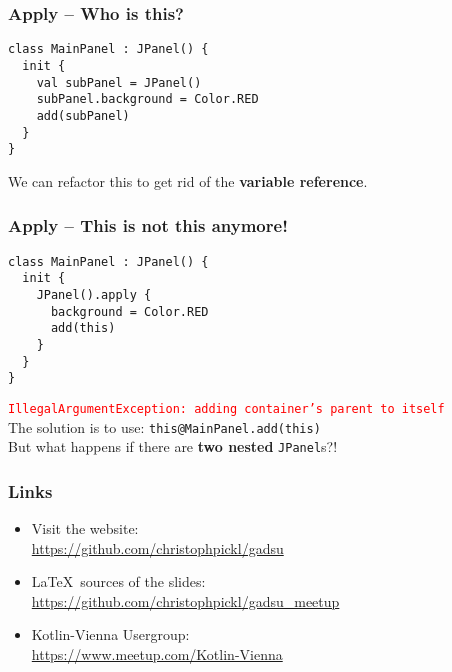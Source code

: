 \begin{frame}[fragile] \frametitle{Apply -- Who is this?}
\begin{lstlisting}
class MainPanel : JPanel() {
  init {
    val subPanel = JPanel()
    subPanel.background = Color.RED
    add(subPanel)
  }
}
\end{lstlisting}
\pause
We can refactor this to get rid of the \textbf{variable reference}.
\end{frame}


\begin{frame}[fragile] \frametitle{Apply -- This is not this anymore!}
\begin{lstlisting}
class MainPanel : JPanel() {
  init {
    JPanel().apply {
      background = Color.RED
      add(this)
    }
  }
}
\end{lstlisting}
\pause
\footnotesize{\texttt{\textcolor{red}{IllegalArgumentException: adding container's parent to itself}}}
\pause
\\
\vspace{0.5cm}
The solution is to use: \texttt{this\textcolor{someBlue}{@MainPanel}.add(this)}\pause \\
But what happens if there are \textbf{two nested} \texttt{JPanel}s?!
\end{frame}


\begin{frame}\frametitle{Links}

\begin{itemize}
	\item Visit the website: \\ \href{https://github.com/christophpickl/gadsu}{https://github.com/christophpickl/gadsu}
	\item \LaTeX~sources of the slides: \\ \href{https://github.com/christophpickl/gadsu_meetup}{https://github.com/christophpickl/gadsu\_meetup}
	\item Kotlin-Vienna Usergroup: \\ \href{https://www.meetup.com/Kotlin-Vienna}{https://www.meetup.com/Kotlin-Vienna}
	
\end{itemize}

\end{frame}



